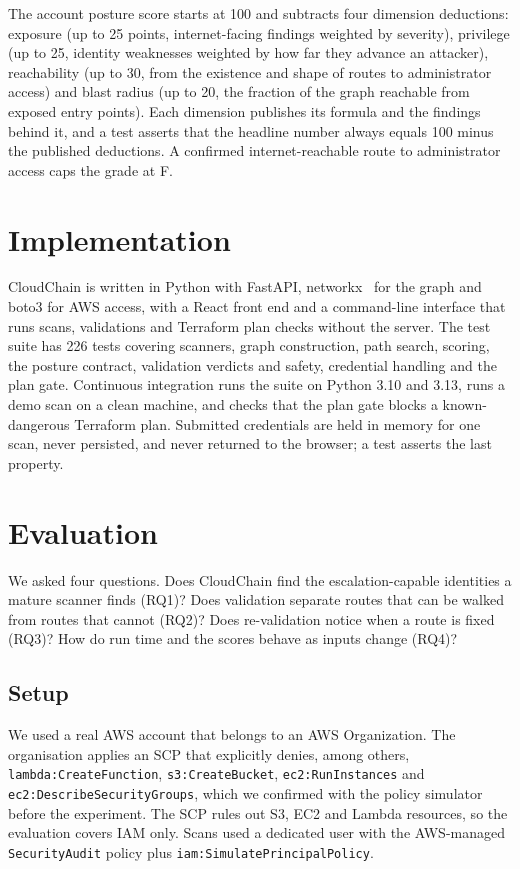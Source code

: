 \documentclass[conference]{IEEEtran}
\begin{document}
The account posture score starts at 100 and subtracts four dimension deductions: exposure (up to 25 points, internet-facing findings weighted by severity), privilege (up to 25, identity weaknesses weighted by how far they advance an attacker), reachability (up to 30, from the existence and shape of routes to administrator access) and blast radius (up to 20, the fraction of the graph reachable from exposed entry points). Each dimension publishes its formula and the findings behind it, and a test asserts that the headline number always equals 100 minus the published deductions. A confirmed internet-reachable route to administrator access caps the grade at F.

\section{Implementation}

CloudChain is written in Python with FastAPI, networkx~\cite{networkx} for the graph and boto3 for AWS access, with a React front end and a command-line interface that runs scans, validations and Terraform plan checks without the server. The test suite has 226 tests covering scanners, graph construction, path search, scoring, the posture contract, validation verdicts and safety, credential handling and the plan gate. Continuous integration runs the suite on Python 3.10 and 3.13, runs a demo scan on a clean machine, and checks that the plan gate blocks a known-dangerous Terraform plan. Submitted credentials are held in memory for one scan, never persisted, and never returned to the browser; a test asserts the last property.

\section{Evaluation}\label{sec:eval}

We asked four questions. Does CloudChain find the escalation-capable identities a mature scanner finds (RQ1)? Does validation separate routes that can be walked from routes that cannot (RQ2)? Does re-validation notice when a route is fixed (RQ3)? How do run time and the scores behave as inputs change (RQ4)?

\subsection{Setup}
We used a real AWS account that belongs to an AWS Organization. The organisation applies an SCP that explicitly denies, among others, \texttt{lambda:CreateFunction}, \texttt{s3:CreateBucket}, \texttt{ec2:RunInstances} and \texttt{ec2:DescribeSecurityGroups}, which we confirmed with the policy simulator before the experiment. The SCP rules out S3, EC2 and Lambda resources, so the evaluation covers IAM only. Scans used a dedicated user with the AWS-managed \texttt{SecurityAudit} policy plus \texttt{iam:SimulatePrincipalPolicy}.
\end{document}
